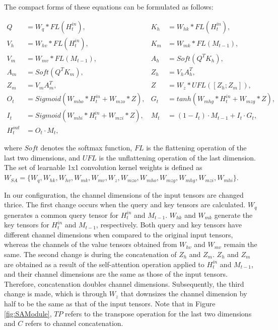 \documentclass{article}
\begin{document}
The compact forms of these equations can be formulated as follows:

\begin{align}
    Q &= W_{q} * FL(H_{t}^{in}), & K_{h} &= W_{hk} * FL(H_{t}^{in}), \\
    V_{h} &= W_{hv} * FL(H_{t}^{in}), & K_{m} &= W_{mk} * FL(M_{t-1}), \\
    V_{m} &= W_{mv} * FL(M_{t-1}), & A_{h} &= Soft(Q^TK_{h}), \\ 
    A_{m} &= Soft(Q^TK_{m}), & Z_{h} &= V_{h}A_{h}^T, \\
    Z_{m} &= V_{m}A_{m}^T, & Z &= W_{z} * UFL([Z_{h}; Z_{m}]), \\
    O_{t} &= Sigmoid(W_{mho} * H_{t}^{in} + W_{mzo} * Z), & G_{t} &= tanh(W_{mhg} * H_{t}^{in} + W_{mzg} * Z), \\
    I_{t} &= Sigmoid(W_{mhi} * H_{t}^{in} + W_{mzi} * Z), & M_{t} &= (1 - I_{t}) \cdot M_{t-1} + I_{t} \cdot G_{t}, \\
    H_{t}^{out} &= O_{t} \cdot M_{t},
\end{align}

where $Soft$ denotes the softmax function, $FL$ is the flattening operation of the last two dimensions, and $UFL$ is the unflattening operation of the last dimension. 
The set of learnable 1x1 convolution kernel weights is defined as $W_{SA} = \{ W_{q}, W_{hk}, W_{hv}, W_{mk}, W_{mv}, W_{z}, W_{mzo}, W_{mho}, W_{mzg}, W_{mhg}, W_{mzi}, W_{mhi} \}$. 

In our configuration, the channel dimensions of the input tensors are changed thrice. The first change occurs when the query and key tensors are calculated. $W_{q}$ generates a common query tensor for $H_{t}^{in}$ and $M_{t-1}$. $W_{hk}$ and $W_{mk}$ generate the key tensors for $H_{t}^{in}$ and $M_{t-1}$, respectively. Both query and key tensors have different channel dimensions when compared to the original input tensors, whereas the channels of the value tensors obtained from $W_{hv}$ and $W_{mv}$ remain the same. The second change is during the concatenation of $Z_{h}$ and $Z_{m}$. $Z_{h}$ and $Z_{m}$ are obtained as a result of the self-attention operation applied to $H_{t}^{in}$ and $M_{t-1}$, and their channel dimensions are the same as those of the input tensors. Therefore, concatenation doubles channel dimensions. Subsequently, the third change is made, which is through $W_{z}$ that downsizes the channel dimension by half to be the same as that of the input tensors.
Note that in Figure \ref{fig:SAModule}, $TP$ refers to the transpose operation for the last two dimensions and $C$ refers to channel concatenation.
\end{document}
